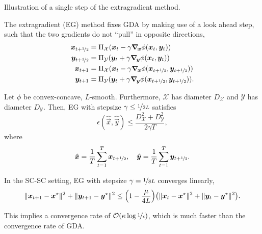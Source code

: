 \begin{marginfigure}
    \centering
    \caption{Illustration of a single step of the extragradient method.}
    \label{fig:extragradient-method}
\end{marginfigure}

The extragradient (EG) method fixes GDA by making use of a look ahead step, such that the two
gradients do not ``pull'' in opposite directions,
\begin{align*}
    \vec{x}_{t+\nicefrac{1}{2}} & = \Pi_{\mathcal{X}}(\vec{x}_t - \gamma \grad{\phi(\vec{x}_t, \vec{y}_t)}{\vec{x}})                                      \\
    \vec{y}_{t+\nicefrac{1}{2}} & = \Pi_{\mathcal{Y}}(\vec{y}_t + \gamma \grad{\phi(\vec{x}_t, \vec{y}_t)}{\vec{y}})                                      \\
    \vec{x}_{t+1}               & = \Pi_{\mathcal{X}}(\vec{x}_t - \gamma \grad{\phi(\vec{x}_{t+\nicefrac{1}{2}}, \vec{y}_{t+\nicefrac{1}{2}})}{\vec{x}})  \\
    \vec{y}_{t+1}               & = \Pi_{\mathcal{Y}}(\vec{y}_t + \gamma \grad{\phi(\vec{x}_{t+\nicefrac{1}{2}}, \vec{y}_{t+\nicefrac{1}{2}})}{\vec{y}}).
\end{align*}

\begin{theorem}[Convergence of EG, C-C]
    Let $\phi$ be convex-concave, $L$-smooth. Furthermore, $\mathcal{X}$ has diameter $D_{\mathcal{X}}$ and $\mathcal{Y}$ has diameter $D_{\mathcal{Y}}$. Then, EG with stepsize $\gamma \leq \nicefrac{1}{2L}$ satisfies \[
        \epsilon(\hat{\vec{x}}, \hat{\vec{y}}) \leq \frac{D_{\mathcal{X}}^2 + D_{\mathcal{Y}}^2}{2 \gamma T},
    \]
    where \[
        \hat{\vec{x}} = \frac{1}{T} \sum_{t=1}^{T} \vec{x}_{t+\nicefrac{1}{2}}, \quad \hat{\vec{y}} = \frac{1}{T} \sum_{t=1}^{T} \vec{y}_{t+\nicefrac{1}{2}}.
    \]
\end{theorem}

\begin{theorem}[Convergence of EG, SC-SC]
    In the SC-SC setting, EG with stepsize $\gamma = \nicefrac{1}{8L}$ converges linearly, \[
        \| \vec{x}_{t+1} - \vec{x}^\star \|^2 + \| \vec{y}_{t+1} - \vec{y}^\star \|^2 \leq \lft( 1 - \frac{\mu}{4L} \rgt) \lft( \| \vec{x}_t - \vec{x}^\star \|^2 + \| \vec{y}_t - \vec{y}^\star \|^2 \rgt).
    \]
\end{theorem}

This implies a convergence rate of $\bigo{\kappa \log \nicefrac{1}{\epsilon}}$, which is much
faster than the convergence rate of GDA.

